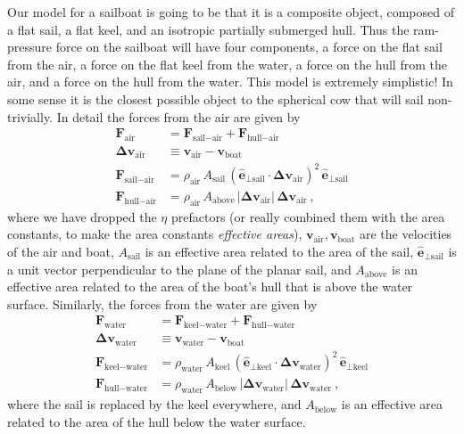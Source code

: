\documentclass[letterpaper]{article}
\renewcommand{\vec}[1]{\boldsymbol{#1}}
\newcommand{\uvec}{\vec{\hat{e}}}
\newcommand{\air}{\text{air}}
\newcommand{\water}{\text{water}}
\newcommand{\boat}{\text{boat}}
\newcommand{\sail}{\text{sail}}
\newcommand{\keel}{\text{keel}}
\newcommand{\hull}{\text{hull}}
\renewcommand{\above}{\text{above}}
\newcommand{\below}{\text{below}}
\newcommand{\vair}{\vec{v}_\air}
\newcommand{\vwater}{\vec{v}_\water}
\newcommand{\vboat}{\vec{v}_\boat}
\begin{document}
Our model for a sailboat is going to be that it is a composite object, composed of a flat sail, a flat keel, and an isotropic partially submerged hull.
Thus the ram-pressure force on the sailboat will have four components, a force on the flat sail from the air, a force on the flat keel from the water, a force on the hull from the air, and a force on the hull from the water.
This model is extremely simplistic!
In some sense it is the closest possible object to the spherical cow that will sail non-trivially.
In detail the forces from the air are given by
\begin{align}\label{eq:startmodel}
  \vec{F}_\air &= \vec{F}_{\sail-\air} + \vec{F}_{\hull-\air}
  \\
  \vec{\Delta v}_\air &\equiv \vair - \vboat \label{eq:deltav}
  \\
  \vec{F}_{\sail-\air} & = \rho_\air\,A_\sail\,(\uvec_{\perp\sail}\cdot\vec{\Delta v}_\air)^2\,\uvec_{\perp\sail} \label{eq:Fsailair}
  \\
  \vec{F}_{\hull-\air} & = \rho_\air\,A_{\above}\,|\vec{\Delta v}_\air|\,\vec{\Delta v}_\air \label{eq:Fhullair} ~,
\end{align}
where we have dropped the $\eta$ prefactors (or really combined them with the area constants, to make the area constants \emph{effective areas}), $\vair,\vboat$ are the velocities of the air and boat, $A_\sail$ is an effective area related to the area of the sail, $\uvec_{\perp\sail}$ is a unit vector perpendicular to the plane of the planar sail, and $A_{\above}$ is an effective area related to the area of the boat's hull that is above the water surface.
Similarly, the forces from the water are given by
\begin{align}
  \vec{F}_\water &= \vec{F}_{\keel-\water} + \vec{F}_{\hull-\water}
  \\
  \vec{\Delta v}_\water &\equiv \vwater - \vboat
  \\
  \vec{F}_{\keel-\water} & = \rho_\water\,A_\keel\,(\uvec_{\perp\keel}\cdot\vec{\Delta v}_\water)^2\,\uvec_{\perp\keel}
  \\
  \vec{F}_{\hull-\water} & = \rho_\water\,A_{\below}\,|\vec{\Delta v}_\water|\,\vec{\Delta v}_\water ~,\label{eq:endmodel}
\end{align}
where the sail is replaced by the keel everywhere, and $A_{\below}$ is an effective area related to the area of the hull below the water surface.
\end{document}
